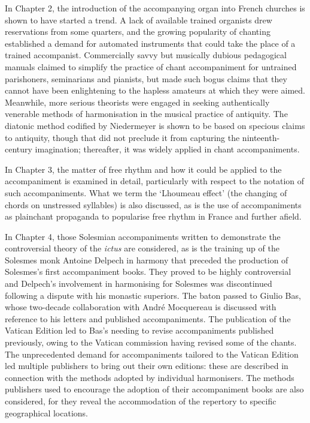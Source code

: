 In Chapter 2, the introduction of the accompanying organ into French churches is shown to have started a trend.
A lack of available trained organists drew reservations from some quarters, and the growing popularity of chanting established a demand for automated instruments that could take the place of a trained accompanist.
Commercially savvy but musically dubious pedagogical manuals claimed to simplify the practice of chant accompaniment for untrained parishoners, seminarians and pianists, but made such bogus claims that they cannot have been enlightening to the hapless amateurs at which they were aimed.
Meanwhile, more serious theorists were engaged in seeking authentically venerable methods of harmonisation in the musical practice of antiquity.
The diatonic method codified by Niedermeyer is shown to be based on specious claims to antiquity, though that did not preclude it from capturing the ninteenth-century imagination; thereafter, it was widely applied in chant accompaniments.

In Chapter 3, the matter of free rhythm and how it could be applied to the accompaniment is examined in detail, particularly with respect to the notation of such accompaniments.
What we term the `Lhoumeau effect' (the changing of chords on unstressed syllables) is also discussed, as is the use of accompaniments as plainchant propaganda to popularise free rhythm in France and further afield.

In Chapter 4, those Solesmian accompaniments written to demonstrate the controversial theory of the \emph{ictus} are considered, as is the training up of the Solesmes monk Antoine Delpech in harmony that preceded the production of Solesmes's first accompaniment books.
They proved to be highly controversial and Delpech's involvement in harmonising for Solesmes was discontinued following a dispute with his monastic superiors.
The baton passed to Giulio Bas, whose two-decade collaboration with André Mocquereau is discussed with reference to his letters and published accompaniments.
The publication of the Vatican Edition led to Bas's needing to revise accompaniments published previously, owing to the Vatican commission having revised some of the chants.
The unprecedented demand for accompaniments tailored to the Vatican Edition led multiple publishers to bring out their own editions: these are described in connection with the methods adopted by individual harmonisers.
The methods publishers used to encourage the adoption of their accompaniment books are also considered, for they reveal the accommodation of the repertory to specific geographical locations.

